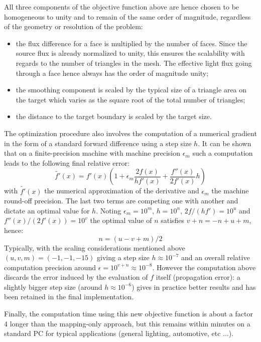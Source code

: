 All three components of the objective function above are hence chosen
to be homogeneous to unity and to remain of the same order of
magnitude, regardless of the geometry or resolution of the problem:
\begin{itemize}
\item the flux difference for a face is multiplied by the number of
  faces.  Since the source flux is already normalized to unity, this
  ensures the scalability with regards to the number of triangles in
  the mesh. The effective light flux going through a face hence always
  has the order of magnitude unity;
\item the smoothing component is scaled by the typical size of a
  triangle area on the target which varies as the square root of the
  total number of triangles;
\item the distance to the target boundary is scaled by the target
  size.
\end{itemize}

The optimization procedure also involves the computation of a
numerical gradient in the form of a standard forward difference using
a step size $h$. It can be shown\cite{Bindel2009} that on a
finite-precision machine with machine precision $\epsilon_m$ such a
computation leads to the following final relative error:
\begin{equation}
 \tilde{f'}(x) = f'(x) \left(1 + \epsilon_m \frac{2f(x)}{hf'(x)} +
 \frac{f''(x)}{2f'(x)}h \right)
 \label{eq:grad_error}
\end{equation}
with $\tilde{f'}(x)$ the numerical approximation of the derivative and
$\epsilon_m$ the machine round-off precision.  The last two terms are
competing one with another and dictate an optimal value for $h$.
Noting $\epsilon_m = 10^m$, $h = 10^n$, ${2f}/(hf') = 10^u$ and
${f''(x)}/(2f'(x)) = 10^v$ the optimal value of $n$ satisfies $ v+n =
-n+u+m $, hence:
\[n = (u-v+m)/2\]
Typically, with the scaling considerations mentioned above $(u,v,m) =
(-1, -1, -15)$ giving a step size $h \approx 10^{-7}$ and an overall
relative computation precision around $\epsilon = 10^{v+n} \approx
10^{-8}$.  However the computation above discards the error induced by
the evaluation of $f$ itself (propagation error): a slightly bigger
step size (around $h \approx 10^{-6}$) gives in practice better
results and has been retained in the final implementation.

Finally, the computation time using this new objective function is
about a factor 4 longer than the mapping-only approach, but this remains 
within minutes on a standard PC for typical applications (general lighting,
automotive, etc ...).

